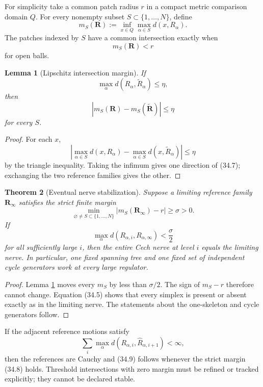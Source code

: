 \documentclass[11pt]{article}
\newtheorem{theorem}{Theorem}[section]
\newtheorem{lemma}[theorem]{Lemma}
\begin{document}
For simplicity take a common patch radius \(r\) in a compact metric
comparison domain \(Q\).  For every nonempty subset
\(S\subset\{1,\ldots,N\}\), define
\[
 m_S(\mathbf R)
 :=
 \inf_{x\in Q}\max_{\alpha\in S}d(x,R_\alpha).
 \tag{34.4}
\]
The patches indexed by \(S\) have a common intersection exactly when
\[
 m_S(\mathbf R)<r
 \tag{34.5}
\]
for open balls.

\begin{lemma}[Lipschitz intersection margin]
\label{lem:v11v34-margin}
If
\[
 \max_\alpha d(R_\alpha,\widetilde R_\alpha)\leq\eta,
 \tag{34.6}
\]
then
\[
 |m_S(\mathbf R)-m_S(\widetilde{\mathbf R})|
 \leq\eta
 \tag{34.7}
\]
for every \(S\).
\end{lemma}

\begin{proof}
For each \(x\),
\[
 \left|
 \max_{\alpha\in S}d(x,R_\alpha)
 -\max_{\alpha\in S}d(x,\widetilde R_\alpha)
 \right|
 \leq\eta
\]
by the triangle inequality.  Taking the infimum gives one direction of
(34.7); exchanging the two reference families gives the other.
\end{proof}

\begin{theorem}[Eventual nerve stabilization]
\label{thm:v11v34-nerve-stability}
Suppose a limiting reference family \(\mathbf R_\infty\) satisfies the
strict finite margin
\[
 \min_{\varnothing\ne S\subset\{1,\ldots,N\}}
 |m_S(\mathbf R_\infty)-r|
 \geq\sigma>0.
 \tag{34.8}
\]
If
\[
 \max_\alpha d(R_{\alpha,i},R_{\alpha,\infty})<\frac\sigma2
 \tag{34.9}
\]
for all sufficiently large \(i\), then the entire Cech nerve at level
\(i\) equals the limiting nerve.  In particular, one fixed spanning
tree and one fixed set of independent cycle generators work at every
large regulator.
\end{theorem}

\begin{proof}
Lemma \ref{lem:v11v34-margin} moves every \(m_S\) by less than
\(\sigma/2\).  The sign of \(m_S-r\) therefore cannot change.
Equation (34.5) shows that every simplex is present or absent exactly as
in the limiting nerve.  The statements about the one-skeleton and cycle
generators follow.
\end{proof}

If the adjacent reference motions satisfy
\[
 \sum_i\max_\alpha
 d(R_{\alpha,i},\widehat R_{\alpha,i+1})<\infty,
 \tag{34.10}
\]
then the references are Cauchy and (34.9) follows whenever the strict
margin (34.8) holds.  Threshold intersections with zero margin must be
refined or tracked explicitly; they cannot be declared stable.
\end{document}
